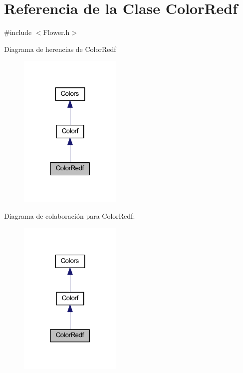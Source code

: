 \hypertarget{class_color_redf}{}\section{Referencia de la Clase Color\+Redf}
\label{class_color_redf}


{\ttfamily \#include $<$Flower.\+h$>$}



Diagrama de herencias de Color\+Redf
\nopagebreak
\begin{figure}[H]
\begin{center}
\leavevmode
\includegraphics[width=139pt]{class_color_redf__inherit__graph}
\end{center}
\end{figure}


Diagrama de colaboración para Color\+Redf\+:
\nopagebreak
\begin{figure}[H]
\begin{center}
\leavevmode
\includegraphics[width=139pt]{class_color_redf__coll__graph}
\end{center}
\end{figure}

